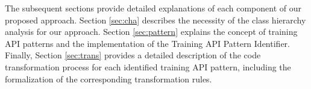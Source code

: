 
The subsequent sections provide detailed explanations of each component of our
proposed approach. 
Section \ref{sec:cha} describes the necessity of the class hierarchy analysis
for our approach.
Section \ref{sec:pattern} explains the concept of training API patterns and the
implementation of the {\sc Training API Pattern Identifier}. 
Finally, Section \ref{sec:trans} provides a detailed description of the code
transformation process for each identified training API pattern, including the
formalization of the corresponding transformation rules.
